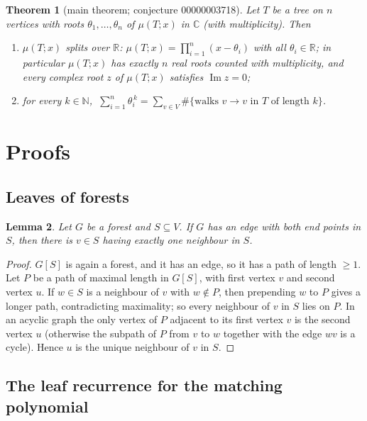 \documentclass[11pt,a4paper]{article}
\newtheorem{theorem}{Theorem}[section]
\newtheorem{lemma}[theorem]{Lemma}
\theoremstyle{definition}
\theoremstyle{remark}
\newcommand{\N}{\mathbb{N}}
\newcommand{\R}{\mathbb{R}}
\newcommand{\C}{\mathbb{C}}
\begin{document}
\begin{theorem}[main theorem; conjecture 00000003718]\label{thm:main}
Let $T$ be a tree on $n$ vertices with roots $\theta_1,\dots,\theta_n$ of $\mu(T;x)$ in $\C$
(with multiplicity). Then
\begin{enumerate}
\item[(a)] $\mu(T;x)$ splits over $\R$: $\mu(T;x)=\prod_{i=1}^n (x-\theta_i)$ with all
$\theta_i\in\R$; in particular $\mu(T;x)$ has exactly $n$ real roots counted with multiplicity,
and every complex root $z$ of $\mu(T;x)$ satisfies $\operatorname{Im} z=0$;
\item[(b)] for every $k\in\N$,
$\ \sum_{i=1}^n\theta_i^{\,k}=\sum_{v\in V}\#\{\text{walks }v\to v\text{ in $T$ of length }k\}$.
\end{enumerate}
\end{theorem}

\section{Proofs}

\subsection{Leaves of forests}

\begin{lemma}\label{lem:leaf}
Let $G$ be a forest and $S\subseteq V$. If $G$ has an edge with both end points in $S$, then there
is $v\in S$ having exactly one neighbour in $S$.
\end{lemma}
\begin{proof}
$G[S]$ is again a forest, and it has an edge, so it has a path of length $\ge1$. Let $P$ be a
path of maximal length in $G[S]$, with first vertex $v$ and second vertex $u$. If $w\in S$ is a
neighbour of $v$ with $w\notin P$, then prepending $w$ to $P$ gives a longer path, contradicting
maximality; so every neighbour of $v$ in $S$ lies on $P$. In an acyclic graph the only vertex of
$P$ adjacent to its first vertex $v$ is the second vertex $u$ (otherwise the subpath of $P$ from
$v$ to $w$ together with the edge $wv$ is a cycle). Hence $u$ is the unique neighbour of $v$ in $S$.
\end{proof}

\subsection{The leaf recurrence for the matching polynomial}
\end{document}

